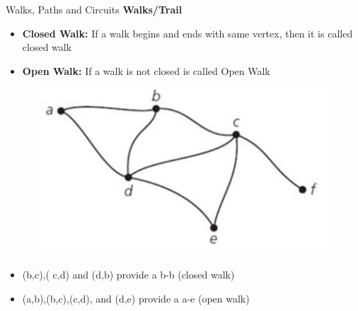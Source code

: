 \documentclass{beamer}
\begin{document}
\begin{frame}{Walks, Paths and Circuits}
	\textbf{Walks/Trail}
		\begin{itemize}
			\item \textbf{Closed Walk:} If a walk begins and ends with same vertex, then it is called 
			closed walk
			\item \textbf{Open Walk:} If a walk is not closed is called Open Walk
		\end{itemize}
	\begin{figure}
		\includegraphics[scale=.5]{img/m26}
	\end{figure}
\begin{itemize}
	\item (b,c),( c,d) and (d,b) provide a b-b (closed walk)
		\item (a,b),(b,c),(c,d), and (d,e) provide a a-e (open walk)
\end{itemize}
\end{frame}
\end{document}
